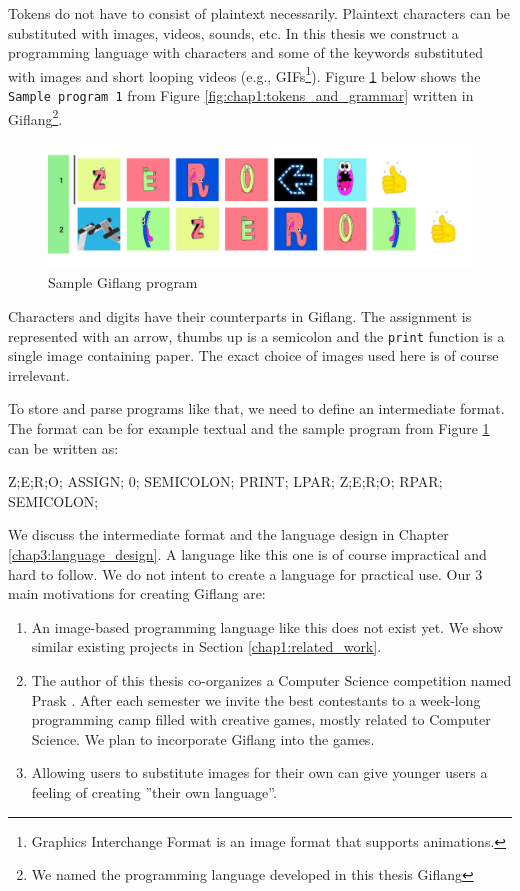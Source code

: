 Tokens do not have to consist of plaintext necessarily. Plaintext characters can be substituted with
images, videos, sounds, etc. In this thesis we construct a programming language with characters and some
of the keywords substituted with images and short looping videos (e.g., GIFs\footnote{Graphics Interchange Format is an image format that supports animations.}).
Figure \ref{fig:chap1:giflang_code} below shows the \texttt{Sample program 1} from Figure \ref{fig:chap1:tokens_and_grammar} written in
Giflang\footnote{We named the programming language developed in this thesis Giflang}.
\begin{figure}[!hbt]
	\includegraphics[width=\textwidth]{../img/giflang_code}
	\caption{Sample Giflang program}
	\label{fig:chap1:giflang_code}
\end{figure}

Characters and digits have their counterparts in Giflang. The assignment is represented with an arrow,
thumbs up is a semicolon and the \texttt{print} function is a single image containing paper. The exact choice of images used here is of course
irrelevant.

To store and parse programs like that, we need to define an intermediate format. The format can be for example
textual and the sample program from Figure \ref{fig:chap1:giflang_code} can be written as:
\begin{code}
Z;E;R;O; ASSIGN; 0; SEMICOLON;
PRINT; LPAR; Z;E;R;O; RPAR; SEMICOLON;
\end{code}

We discuss the intermediate format and the language design in Chapter \ref{chap3:language_design}. A language like this one is of
course impractical and hard to follow. We do not intent to create a language for practical use. Our $3$ main motivations for
creating Giflang are:
\begin{enumerate}
\item An image-based programming language like this does not exist yet. We show similar existing projects in Section \ref{chap1:related_work}. 
\item The author of this thesis co-organizes a Computer Science competition named Prask \cite{Prask}. After each semester we invite the best
contestants to a week-long programming camp filled with creative games, mostly related to Computer Science. We plan to incorporate Giflang into the games.
\item Allowing users to substitute images for their own can give younger users a feeling of creating ''their own language''.
\end{enumerate}

